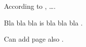 \documentclass{article}
\begin{document}
    
According to \cite{lamport1994latex}, \dots.

Bla bla bla is bla bla bla \cite{griffiths1997learning, goossens1997latex}.

Can add page also \cite[p.~32]{lamport1994latex}.
    


    
\end{document}
